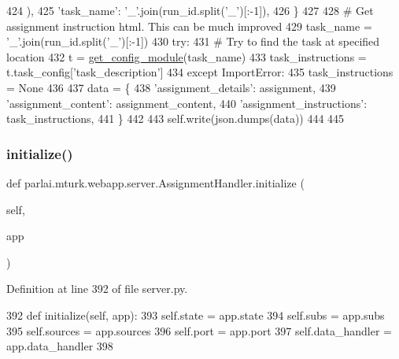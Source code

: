 \begin{DoxyCode}
424             ),
425             \textcolor{stringliteral}{'task\_name'}: \textcolor{stringliteral}{'\_'}.join(run\_id.split(\textcolor{stringliteral}{'\_'})[:-1]),
426         \}
427 
428         \textcolor{comment}{# Get assignment instruction html. This can be much improved}
429         task\_name = \textcolor{stringliteral}{'\_'}.join(run\_id.split(\textcolor{stringliteral}{'\_'})[:-1])
430         \textcolor{keywordflow}{try}:
431             \textcolor{comment}{# Try to find the task at specified location}
432             t = \hyperlink{namespaceparlai_1_1mturk_1_1webapp_1_1server_aee065cfdb6346d4815762ae793427f1e}{get\_config\_module}(task\_name)
433             task\_instructions = t.task\_config[\textcolor{stringliteral}{'task\_description'}]
434         \textcolor{keywordflow}{except} ImportError:
435             task\_instructions = \textcolor{keywordtype}{None}
436 
437         data = \{
438             \textcolor{stringliteral}{'assignment\_details'}: assignment,
439             \textcolor{stringliteral}{'assignment\_content'}: assignment\_content,
440             \textcolor{stringliteral}{'assignment\_instructions'}: task\_instructions,
441         \}
442 
443         self.write(json.dumps(data))
444 
445 
\end{DoxyCode}
\mbox{\label{classparlai_1_1mturk_1_1webapp_1_1server_1_1AssignmentHandler_a4d6fc0f6605557f5ede04d06db680640}} 
\subsubsection{\texorpdfstring{initialize()}{initialize()}}
{\footnotesize\ttfamily def parlai.\+mturk.\+webapp.\+server.\+Assignment\+Handler.\+initialize (\begin{DoxyParamCaption}\item[{}]{self,  }\item[{}]{app }\end{DoxyParamCaption})}



Definition at line 392 of file server.\+py.


\begin{DoxyCode}
392     \textcolor{keyword}{def }initialize(self, app):
393         self.state = app.state
394         self.subs = app.subs
395         self.sources = app.sources
396         self.port = app.port
397         self.data\_handler = app.data\_handler
398 
\end{DoxyCode}


